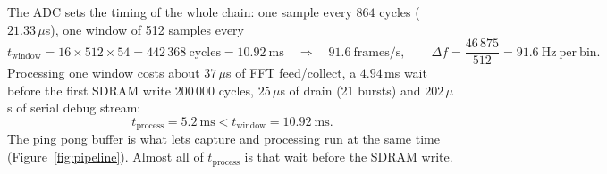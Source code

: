 \documentclass[a4paper,10pt]{article}
\begin{document}
The ADC sets the timing of the whole chain: one sample every $864$ cycles ($21.33\,\mu$s),
one window of 512 samples every
\[
t_\mathrm{window} = 16\times512\times54 = 442\,368\ \mathrm{cycles} = 10.92\ \mathrm{ms}
\quad\Rightarrow\quad 91.6\ \mathrm{frames/s},\qquad
\Delta f = \frac{46\,875}{512} = 91.6\ \mathrm{Hz\ per\ bin}.
\]
Processing one window costs about $37\,\mu$s of FFT feed/collect, a 
$4.94$\,ms wait before the first SDRAM write 200\,000 cycles, $25\,\mu$s of drain (21 bursts) and $202\,\mu$s of serial debug stream:
\[
t_\mathrm{process} = 5.2\ \mathrm{ms} < t_\mathrm{window} = 10.92\ \mathrm{ms}.
\]
The ping pong buffer is what lets capture and processing run at the same time
(Figure~\ref{fig:pipeline}). Almost all of $t_\mathrm{process}$ is that wait before the
SDRAM write.

\newcommand{\pclk}[4]{%
  \foreach \i in {1,...,#2}{%
    \draw[line width=0.5pt]
      ({#1+(\i-1)*#3},{#4-0.16}) -- ({#1+(\i-1)*#3},{#4+0.16})
      -- ({#1+(\i-1)*#3+0.5*#3},{#4+0.16}) -- ({#1+(\i-1)*#3+0.5*#3},{#4-0.16})
      -- ({#1+(\i-1)*#3+#3},{#4-0.16});}}
\newcommand{\pbus}[4]{%
  \draw[line width=0.6pt] ({#1},{#3+0.2}) -- ({#2},{#3+0.2});
  \draw[line width=0.6pt] ({#1},{#3-0.2}) -- ({#2},{#3-0.2});
  \draw[line width=0.6pt] ({#1},{#3-0.2}) -- ({#1},{#3+0.2});
  \draw[line width=0.6pt] ({#2},{#3-0.2}) -- ({#2},{#3+0.2});
  \node[font=\tiny] at ({(#1+#2)/2},{#3}) {#4};}
\newcommand{\plow}[3]{\draw[line width=0.7pt] ({#1},{#3-0.2}) -- ({#2},{#3-0.2});}
\newcommand{\phigh}[3]{\draw[line width=0.7pt] ({#1},{#3+0.2}) -- ({#2},{#3+0.2});}
\newcommand{\pcut}[3]{%
  \draw[white, line width=4pt] ({#1},{#2}) -- ({#1},{#3});
  \draw[line width=0.5pt] ({#1-0.14},{#2}) -- ({#1+0.02},{#3});
  \draw[line width=0.5pt] ({#1+0.10},{#2}) -- ({#1+0.26},{#3});}
\end{document}
